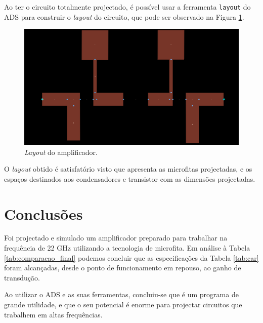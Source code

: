 \documentclass[11pt]{article}
\numberwithin{equation}{section}
\begin{document}
Ao ter o circuito totalmente projectado, é possível usar a ferramenta \texttt{layout} do ADS para construir o \textit{layout} do circuito, que pode ser observado na Figura \ref{fig:layout}.

\begin{figure}[H]
	\centering
	\includegraphics[keepaspectratio=true, scale=0.45]{exps/layout}
	\vspace{-0.5em}
	\caption{\textit{Layout} do amplificador.}
	\vspace{-0.8em}
	\label{fig:layout}
\end{figure}

O \textit{layout} obtido é satisfatório visto que apresenta as microfitas projectadas, e os espaços destinados aos condensadores e transistor com as dimensões projectadas.
 
\section{Conclusões}

Foi projectado e simulado um amplificador preparado para trabalhar na frequência de 22 GHz utilizando a tecnologia de microfita. Em análise à Tabela \ref{tab:comparacao_final} podemos concluir que as especificações da Tabela \ref{tab:car} foram alcançadas, desde o ponto de funcionamento em repouso, ao ganho de transdução.

Ao utilizar o ADS e as suas ferramentas, concluiu-se que é um programa de grande utilidade, e que o seu potencial é enorme para projectar circuitos que trabalhem em altas frequências.
\end{document}
